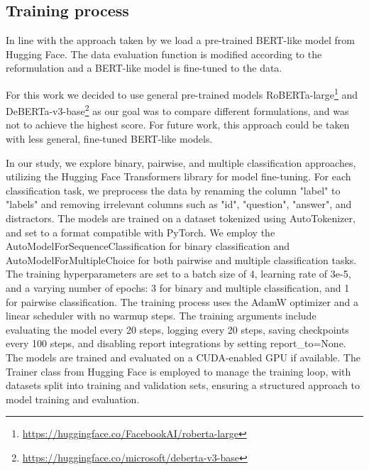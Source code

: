 \subsection{Training process}
In line with the approach taken by \citep{ails-lab} we load a pre-trained BERT-like model from Hugging Face.
The data evaluation function is modified according to the reformulation and a BERT-like model is fine-tuned to the data.

For this work we decided to use general pre-trained models RoBERTa-large\footnote[4]{\url{https://huggingface.co/FacebookAI/roberta-large}} \citep{roberta} and DeBERTa-v3-base\footnote[5]{\url{https://huggingface.co/microsoft/deberta-v3-base}} \citep{deberta,debertav3} as our goal was to compare different formulations, and was not to achieve the highest score.
For future work, this approach could be taken with less general, fine-tuned BERT-like models.

In our study, we explore binary, pairwise, and multiple classification approaches, utilizing the Hugging Face Transformers library for model fine-tuning. 
For each classification task, we preprocess the data by renaming the column "label" to "labels" and removing irrelevant columns such as "id", "question", "answer", 
and distractors. The models are trained on a dataset tokenized using AutoTokenizer, and set to a format compatible with PyTorch. We employ the
AutoModelForSequenceClassification for binary classification and AutoModelForMultipleChoice for both pairwise and multiple classification tasks. 
The training hyperparameters are set to a batch size of 4, learning rate of 3e-5, and a varying number of epochs: 3 for binary and multiple classification, 
and 1 for pairwise classification. The training process uses the AdamW optimizer and a linear scheduler with no warmup steps. The training arguments include 
evaluating the model every 20 steps, logging every 20 steps, saving checkpoints every 100 steps, and disabling report integrations by setting report\_to=None. 
The models are trained and evaluated on a CUDA-enabled GPU if available. The Trainer class from Hugging Face is employed to manage the training loop, with datasets 
split into training and validation sets, ensuring a structured approach to model training and evaluation. 
